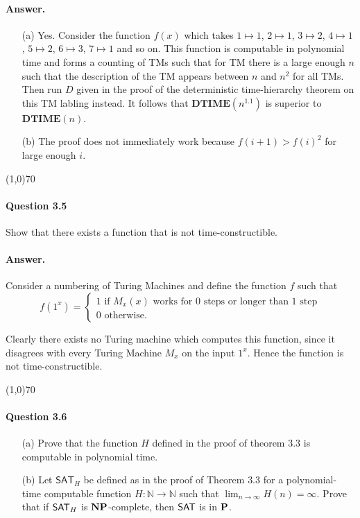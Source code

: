 \paragraph{Answer.}
\begin{enumerate}
	\item[(a)] Yes. Consider the function $f(x)$ which takes $1\mapsto 1$, $2\mapsto 1$, $3\mapsto 2$, $4\mapsto 1$, $5\mapsto 2$, $6\mapsto 3$, $7\mapsto 1$ and so on. This function is computable in polynomial time and forms a counting of TMs such that for TM there is a large enough $n$ such that the description of the TM appears between $n$ and $n^2$ for all TMs. Then run $D$ given in the proof of the deterministic time-hierarchy theorem on this TM labling instead. It follows that $\mathbf{DTIME}(n^{1.1})$ is superior to $\mathbf{DTIME}(n)$.
	\item[(b)] The proof does not immediately work because $f(i+1)>f(i)^2$ for large enough $i$.
\end{enumerate}

\begin{center}
	\line(1,0){70}
\end{center}

\paragraph{Question 3.5} Show that there exists a function that is not time-constructible.

\paragraph{Answer.} Consider a numbering of Turing Machines and define the function $f$ such that
$$f(1^x)=\begin{cases}
	1\text{ if $M_x(x)$ works for $0$ steps or longer than $1$ step}\\
	0\text{ otherwise.}
\end{cases}$$

Clearly there exists no Turing machine which computes this function, since it disagrees with every Turing Machine $M_x$ on the input $1^x$. Hence the function is not time-constructible.

\begin{center}
	\line(1,0){70}
\end{center}

\paragraph{Question 3.6}
\begin{itemize}
	\item[(a)] Prove that the function $H$ defined in the proof of theorem $3.3$ is computable in polynomial time.
	\item[(b)] Let $\mathsf{SAT}_H$ be defined as in the proof of Theorem $3.3$ for a polynomial-time computable function $H:\mathbb{N}\rightarrow\mathbb{N}$ such that $\lim_{n\rightarrow\infty}H(n)=\infty.$ Prove that if $\mathsf{SAT}_H$ is $\mathbf{NP}$-complete, then $\mathsf{SAT}$ is in $\mathbf{P}$.
\end{itemize} 

